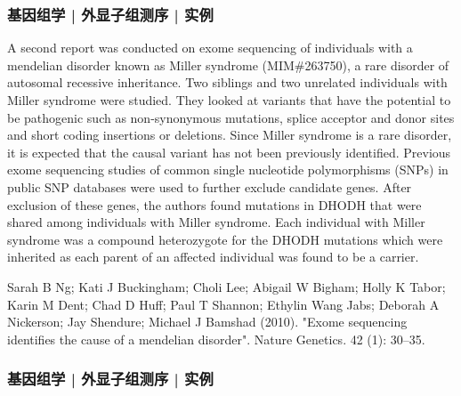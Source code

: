 \begin{frame}
  \frametitle{基因组学 | 外显子组测序  | 实例}
  A second report was conducted on exome sequencing of individuals with a mendelian disorder known as Miller syndrome (MIM\#263750), a rare disorder of autosomal recessive inheritance. Two siblings and two unrelated individuals with Miller syndrome were studied. They looked at variants that have the potential to be pathogenic such as non-synonymous mutations, splice acceptor and donor sites and short coding insertions or deletions. Since Miller syndrome is a rare disorder, it is expected that the causal variant has not been previously identified. Previous exome sequencing studies of common single nucleotide polymorphisms (SNPs) in public SNP databases were used to further exclude candidate genes. After exclusion of these genes, the authors found mutations in DHODH that were shared among individuals with Miller syndrome. Each individual with Miller syndrome was a compound heterozygote for the DHODH mutations which were inherited as each parent of an affected individual was found to be a carrier.

  Sarah B Ng; Kati J Buckingham; Choli Lee; Abigail W Bigham; Holly K Tabor; Karin M Dent; Chad D Huff; Paul T Shannon; Ethylin Wang Jabs; Deborah A Nickerson; Jay Shendure; Michael J Bamshad (2010). "Exome sequencing identifies the cause of a mendelian disorder". Nature Genetics. 42 (1): 30–35.
\end{frame}

\begin{frame}
  \frametitle{基因组学 | 外显子组测序  | 实例}
\end{frame}

